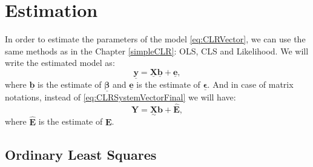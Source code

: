 \documentclass[
]{book}
\begin{document}
\hypertarget{mlcrEstimation}{%
\section{Estimation}\label{mlcrEstimation}}

In order to estimate the parameters of the model \eqref{eq:CLRVector}, we can use the same methods as in the Chapter \ref{simpleCLR}: OLS, CLS and Likelihood. We will write the estimated model as:
\begin{equation}
    \underline{\mathbf{y}} = \underline{\mathbf{X}} \underline{\boldsymbol{b}} + \underline{\mathbf{e}} ,
    \label{eq:CLRVectorEstimated}
\end{equation}
where \(\underline{\boldsymbol{b}}\) is the estimate of \(\underline{\boldsymbol{\beta}}\) and \(\underline{\mathbf{e}}\) is the estimate of \(\underline{\mathbf{\epsilon}}\). And in case of matrix notations, instead of \eqref{eq:CLRSystemVectorFinal} we will have:
\begin{equation}
    \mathbf{Y} = \underset{\sim}{\mathbf{X}} \boldsymbol{b} + \hat{\mathbf{E}} ,
    \label{eq:CLRSystemVectorFinalEstimated}
\end{equation}
where \(\hat{\mathbf{E}}\) is the estimate of \({\mathbf{E}}\).

\hypertarget{ordinary-least-squares}{%
\subsection{Ordinary Least Squares}\label{ordinary-least-squares}}
\end{document}
